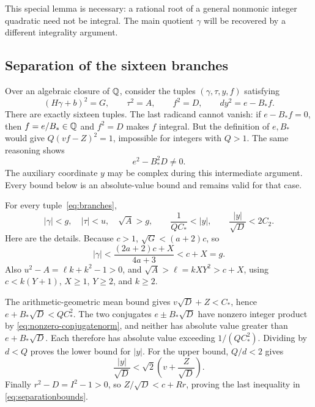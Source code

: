 This special lemma is necessary: a rational root of a general nonmonic
integer quadratic need not be integral.  The main quotient $\gamma$
will be recovered by a different integrality argument.

\subsection{Separation of the sixteen branches}

Over an algebraic closure of $\mathbb Q$, consider the tuples
$(\gamma,\tau,y,f)$ satisfying
\begin{equation}
(H\gamma+b)^2=G,\qquad \tau^2=A,\qquad f^2=D,
\qquad dy^2=e-B_*f.
\label{eq:branches}
\end{equation}
There are exactly sixteen tuples.  The last radicand cannot vanish:
if $e-B_*f=0$, then $f=e/B_*\in\mathbb Q$ and $f^2=D$ makes $f$ integral.
But the definition of $e,B_*$ would give $Q(vf-Z)^2=1$, impossible
for integers with $Q>1$.  The same reasoning shows
\begin{equation}
e^2-B_*^2D\ne0.
\label{eq:nonzero-conjugatenorm}
\end{equation}
The auxiliary coordinate $y$ may be complex during this intermediate
argument.  Every bound below is an absolute-value bound and remains
valid for that case.

For every tuple~\eqref{eq:branches},
\begin{equation}
|\gamma|<g,\quad |\tau|<u,\quad \sqrt A>g,
\qquad \frac1{QC_*}<|y|,
\qquad \frac{|y|}{\sqrt D}<2C_2.
\label{eq:separationbounds}
\end{equation}
Here are the details.  Because $c>1$,
$\sqrt G<(a+2)c$, so
\[
|\gamma|<\frac{(2a+2)c+X}{4a+3}<c+X=g.
\]
Also $u^2-A=\ell k+k^2-1>0$, and
$\sqrt A>\ell=kXY^2>c+X$, using $c<k(Y+1)$,
$X\ge1$, $Y\ge2$, and $k\ge2$.

The arithmetic-geometric mean bound gives $v\sqrt D+Z<C_*$, hence
$e+B_*\sqrt D<QC_*^2$.  The two conjugates
$e\pm B_*\sqrt D$ have nonzero integer product by
\eqref{eq:nonzero-conjugatenorm}, and neither has absolute value greater
than $e+B_*\sqrt D$.  Each therefore has absolute value exceeding
$1/(QC_*^2)$.  Dividing by $d<Q$ proves the lower bound for $|y|$.
For the upper bound, $Q/d<2$ gives
\[
\frac{|y|}{\sqrt D}<\sqrt2\left(v+\frac Z{\sqrt D}\right).
\]
Finally $r^2-D=I^2-1>0$, so
$Z/\sqrt D<c+Rr$, proving the last inequality in
\eqref{eq:separationbounds}.

